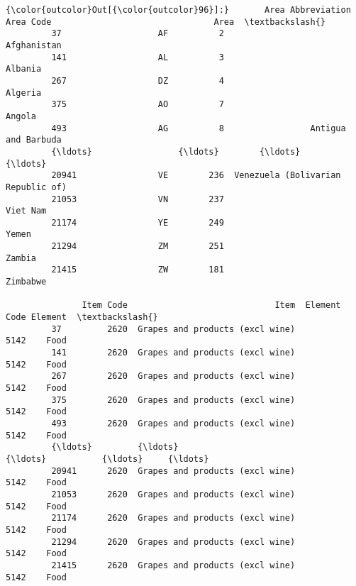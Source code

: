 \documentclass[11pt]{article}
\begin{document}
\begin{Verbatim}[commandchars=\\\{\}]
{\color{outcolor}Out[{\color{outcolor}96}]:}       Area Abbreviation  Area Code                                Area  \textbackslash{}
         37                   AF          2                         Afghanistan   
         141                  AL          3                             Albania   
         267                  DZ          4                             Algeria   
         375                  AO          7                              Angola   
         493                  AG          8                 Antigua and Barbuda   
         {\ldots}                 {\ldots}        {\ldots}                                 {\ldots}   
         20941                VE        236  Venezuela (Bolivarian Republic of)   
         21053                VN        237                            Viet Nam   
         21174                YE        249                               Yemen   
         21294                ZM        251                              Zambia   
         21415                ZW        181                            Zimbabwe   
         
               Item Code                             Item  Element Code Element  \textbackslash{}
         37         2620  Grapes and products (excl wine)          5142    Food   
         141        2620  Grapes and products (excl wine)          5142    Food   
         267        2620  Grapes and products (excl wine)          5142    Food   
         375        2620  Grapes and products (excl wine)          5142    Food   
         493        2620  Grapes and products (excl wine)          5142    Food   
         {\ldots}         {\ldots}                              {\ldots}           {\ldots}     {\ldots}   
         20941      2620  Grapes and products (excl wine)          5142    Food   
         21053      2620  Grapes and products (excl wine)          5142    Food   
         21174      2620  Grapes and products (excl wine)          5142    Food   
         21294      2620  Grapes and products (excl wine)          5142    Food   
         21415      2620  Grapes and products (excl wine)          5142    Food   
         

\end{Verbatim}
\end{document}
